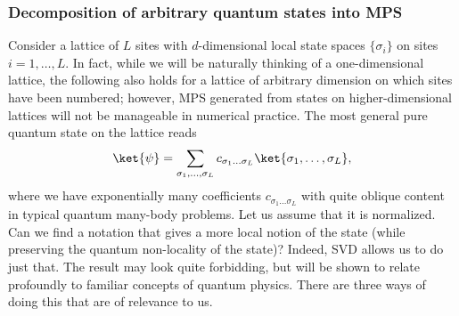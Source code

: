 \subsubsection{Decomposition of arbitrary quantum states into MPS}
\label{subsubsec:MPSdecomposition}
Consider a lattice of $L$ sites with $d$-dimensional local state spaces $\{ \sigma_i \}$ on sites $i=1,\ldots,L$. In fact, while we will be naturally thinking of a one-dimensional lattice, the following also holds for a  lattice of arbitrary dimension on which sites have been numbered; however, MPS generated from states on higher-dimensional lattices will not be manageable in numerical practice. The most general pure quantum state on the lattice reads
\begin{equation}
\ket{\psi} = \sum_{\sigma_1,\ldots,\sigma_L} c_{\sigma_1 \ldots \sigma_L} \ket{\sigma_1,\ldots,\sigma_L},
\end{equation}
where we have exponentially many coefficients $c_{\sigma_1 \ldots \sigma_L}$ with quite oblique content in typical quantum many-body problems. Let us assume that it is normalized. Can we find a notation that gives a more local notion of the state (while preserving the quantum non-locality of the state)? Indeed, SVD allows us to do just that. The result may look quite forbidding, but will be shown to relate profoundly to familiar concepts of quantum physics. There are three ways of doing this that are of relevance to us.

